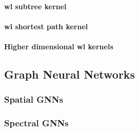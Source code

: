 \paragraph{\ac{wl} subtree kernel}

\paragraph{\ac{wl} shortest path kernel}

\paragraph{Higher dimensional \ac{wl} kernels}

\subsection{Graph Neural Networks}%
\label{sec:related:gcr:nn}

\subsubsection{Spatial GNNs}

\subsubsection{Spectral GNNs}
